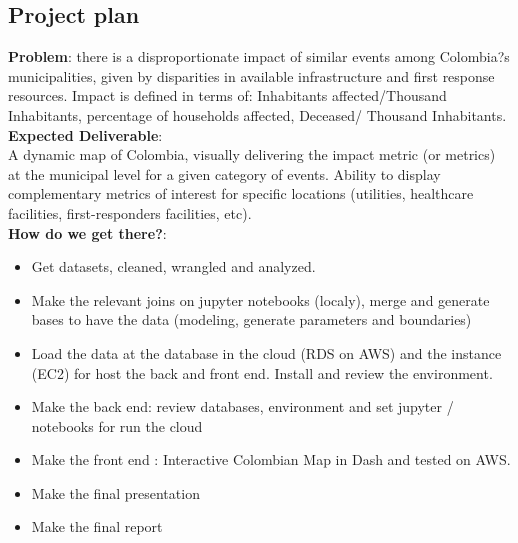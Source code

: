 \documentclass[11pt]{article}
\begin{document}
\subsection{Project plan}

\textbf{Problem}: there is a disproportionate impact of similar events among Colombia?s municipalities,
given by disparities in available infrastructure and first response resources. Impact is defined in terms of: Inhabitants affected/Thousand Inhabitants, percentage of households affected, Deceased/ Thousand Inhabitants.\\

\textbf{Expected Deliverable}:\\
A dynamic map of Colombia, visually delivering the impact metric (or metrics) at the municipal level for a given category of events. Ability to display complementary metrics of interest for specific locations (utilities, healthcare facilities, first-responders facilities, etc).\\

\textbf{How do we get there?}:

\begin{itemize}
\item Get datasets, cleaned, wrangled and analyzed.
\item Make the relevant joins on jupyter notebooks (localy), merge and generate bases to have the data (modeling, generate parameters and boundaries)
\item Load the data at the database in the cloud (RDS on AWS) and the instance (EC2) for host the back and front end. Install and review the environment.
\item Make the back end: review databases, environment and set jupyter / notebooks for run the cloud
\item Make the front end : Interactive Colombian Map in Dash and tested on AWS.
\item Make the final presentation
\item Make the final report
\end{itemize}

%
%




\end{document}

